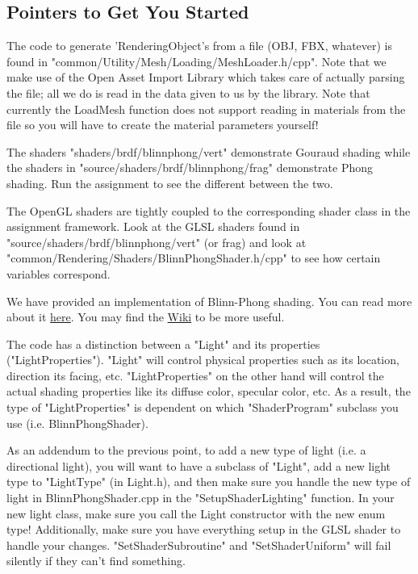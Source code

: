 \documentclass{article}
\begin{document}
\subsection*{Pointers to Get You Started}
\begin{itemize*}
    \item The code to generate 'RenderingObject's from a file (OBJ, FBX, whatever) is found in "common/Utility/Mesh/Loading/MeshLoader.h/cpp". Note that we make use of the Open Asset Import Library which takes care of actually parsing the file; all we do is read in the data given to us by the library. Note that currently the LoadMesh function does not support reading in materials from the file so you will have to create the material parameters yourself!
    \item The shaders "shaders/brdf/blinnphong/vert" demonstrate Gouraud shading while the shaders in "source/shaders/brdf/blinnphong/frag" demonstrate Phong shading. Run the assignment to see the different between the two.
    \item The OpenGL shaders are tightly coupled to the corresponding shader class in the assignment framework. Look at the GLSL shaders found in "source/shaders/brdf/blinnphong/vert" (or frag) and look at "common/Rendering/Shaders/BlinnPhongShader.h/cpp" to see how certain variables correspond.
    \item We have provided an implementation of Blinn-Phong shading. You can read more about it \href{http://citeseerx.ist.psu.edu/viewdoc/download?doi=10.1.1.131.7741&rep=rep1&type=pdf}{here}. You may find the \href{https://en.wikipedia.org/wiki/Blinn%E2%80%93Phong_shading_model}{Wiki} to be more useful.
    \item The code has a distinction between a "Light" and its properties ("LightProperties"). "Light" will control physical properties such as its location, direction its facing, etc. "LightProperties" on the other hand will control the actual shading properties like its diffuse color, specular color, etc. As a result,  the type of "LightProperties" is dependent on which "ShaderProgram" subclass you use (i.e. BlinnPhongShader).
    \item As an addendum to the previous point, to add a new type of light (i.e. a directional light), you will want to have a subclass of "Light", add a new light type to "LightType" (in Light.h), and then make sure you handle the new type of light in BlinnPhongShader.cpp in the "SetupShaderLighting" function. In your new light class, make sure you call the Light constructor with the new enum type! Additionally, make sure you have everything setup in the GLSL shader to handle your changes. "SetShaderSubroutine" and "SetShaderUniform" will fail silently if they can't find something.
\end{itemize*}
\end{document}
